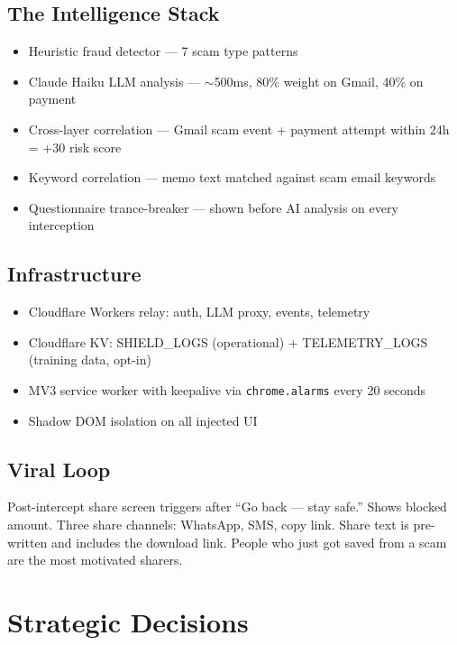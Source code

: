 \documentclass[12pt, letterpaper]{article}
\begin{document}
\subsection{The Intelligence Stack}

\begin{itemize}
  \item Heuristic fraud detector --- 7 scam type patterns
  \item Claude Haiku LLM analysis --- $\sim$500ms, 80\% weight on Gmail, 40\% on payment
  \item Cross-layer correlation --- Gmail scam event + payment attempt within 24h = +30 risk score
  \item Keyword correlation --- memo text matched against scam email keywords
  \item Questionnaire trance-breaker --- shown before AI analysis on every interception
\end{itemize}

\subsection{Infrastructure}

\begin{itemize}
  \item Cloudflare Workers relay: auth, LLM proxy, events, telemetry
  \item Cloudflare KV: SHIELD\_LOGS (operational) + TELEMETRY\_LOGS (training data, opt-in)
  \item MV3 service worker with keepalive via \texttt{chrome.alarms} every 20 seconds
  \item Shadow DOM isolation on all injected UI
\end{itemize}

\subsection{Viral Loop}

Post-intercept share screen triggers after ``Go back --- stay safe.'' Shows blocked amount. Three share channels: WhatsApp, SMS, copy link. Share text is pre-written and includes the download link. People who just got saved from a scam are the most motivated sharers.

\section{Strategic Decisions}
\end{document}
